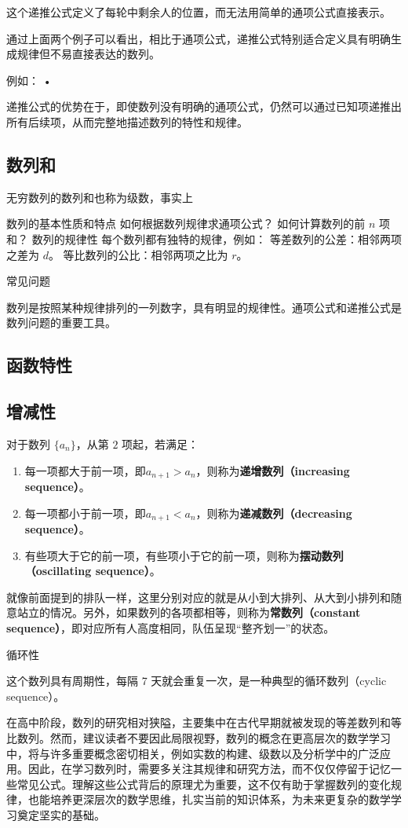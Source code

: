 这个递推公式定义了每轮中剩余人的位置，而无法用简单的通项公式直接表示。

通过上面两个例子可以看出，相比于通项公式，递推公式特别适合定义具有明确生成规律但不易直接表达的数列。


例如：
	•	

递推公式的优势在于，即使数列没有明确的通项公式，仍然可以通过已知项递推出所有后续项，从而完整地描述数列的特性和规律。

\subsection{数列和}

无穷数列的数列和也称为级数，事实上


数列的基本性质和特点
如何根据数列规律求通项公式？
如何计算数列的前 $n$ 项和？
数列的规律性
每个数列都有独特的规律，例如：
等差数列的公差：相邻两项之差为 $d$。
等比数列的公比：相邻两项之比为 $r$。

常见问题


数列是按照某种规律排列的一列数字，具有明显的规律性。通项公式和递推公式是数列问题的重要工具。
\subsection{函数特性}

\subsection{增减性}

对于数列 $\{a_n\}$，从第 $2$ 项起，若满足：
\begin{enumerate}
\item 每一项都大于前一项，即$a_{n+1} > a_n$，则称为\textbf{递增数列（increasing sequence）}。
\item 每一项都小于前一项，即$a_{n+1} < a_n$，则称为\textbf{递减数列（decreasing sequence）}。
\item 有些项大于它的前一项，有些项小于它的前一项，则称为\textbf{摆动数列（oscillating sequence）}。
\end{enumerate}
就像前面提到的排队一样，这里分别对应的就是从小到大排列、从大到小排列和随意站立的情况。另外，如果数列的各项都相等，则称为\textbf{常数列（constant sequence）}，即对应所有人高度相同，队伍呈现“整齐划一”的状态。



循环性


这个数列具有周期性，每隔 7 天就会重复一次，是一种典型的循环数列（cyclic sequence）。

在高中阶段，数列的研究相对狭隘，主要集中在古代早期就被发现的等差数列和等比数列。然而，建议读者不要因此局限视野，数列的概念在更高层次的数学学习中，将与许多重要概念密切相关，例如实数的构建、级数以及分析学中的广泛应用。因此，在学习数列时，需要多关注其规律和研究方法，而不仅仅停留于记忆一些常见公式。理解这些公式背后的原理尤为重要，这不仅有助于掌握数列的变化规律，也能培养更深层次的数学思维，扎实当前的知识体系，为未来更复杂的数学学习奠定坚实的基础。